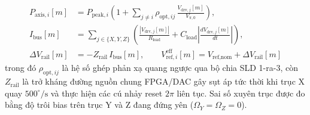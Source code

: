\documentclass[11pt, a4paper]{article}
\begin{document}
\begin{equation}
\begin{aligned}
P_{\text{axis},i}[m] &= P_{\text{peak},i}\left(1 + \sum_{j \ne i} \rho_{\text{opt},ij}\,\frac{V_{\text{drv},j}[m]}{V_{\pi,0}}\right), \\
I_{\text{bus}}[m] &= \sum_{j \in \{X,Y,Z\}} \left(\frac{|V_{\text{drv},j}[m]|}{R_{\text{load}}} + C_{\text{load}}\left|\frac{dV_{\text{drv},j}[m]}{dt}\right|\right), \\
\Delta V_{\text{rail}}[m] &= -Z_{\text{rail}}\,I_{\text{bus}}[m], \qquad
V_{\text{ref},i}^{\text{eff}}[m] = V_{\text{ref,nom}} + \Delta V_{\text{rail}}[m]
\end{aligned}
\label{eq:eq36_imu3axis}
\end{equation}
trong đó $\rho_{\text{opt},ij}$ là hệ số ghép phản xạ quang ngược qua bộ chia SLD 1-ra-3, còn $Z_{\text{rail}}$ là trở kháng đường nguồn chung FPGA/DAC gây sụt áp tức thời khi trục X quay $500^\circ/\text{s}$ và thực hiện các cú nhảy reset $2\pi$ liên tục. Sai số xuyên trục được đo bằng độ trôi bias trên trục Y và Z đang đứng yên ($\Omega_Y = \Omega_Z = 0$).
\end{document}
